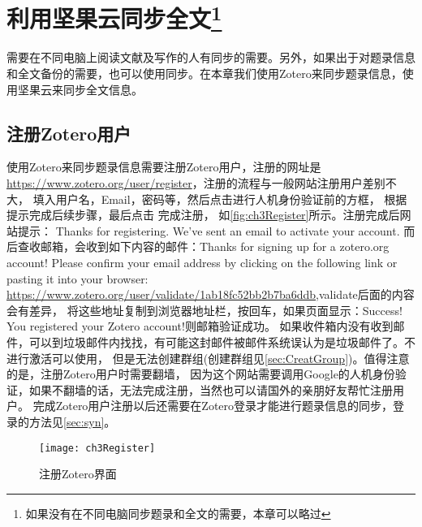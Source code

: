 \documentclass[cn,11pt,chinese]{elegantbook}
\begin{document}
	\chapter[利用坚果云同步全文]{利用坚果云同步全文\footnote{如果没有在不同电脑同步题录和全文的需要，本章可以略过}}\label{ch:syn}		
		需要在不同电脑上阅读文献及写作的人有同步的需要。另外，如果出于对题录信息和全文备份的需要，也可以使用同步。在本章我们使用Zotero来同步题录信息，使用坚果云来同步全文信息。
			\section{注册Zotero用户}\label{sec:zotReg}
		使用Zotero来同步题录信息需要注册Zotero用户，注册的网址是\url{https://www.zotero.org/user/register}，注册的流程与一般网站注册用户差别不大，
		填入用户名，Email，密码等，然后点击进行人机身份验证前的方框，
		根据提示完成后续步骤，最后点击 完成注册，
		如\autoref{fig:ch3Register}所示。注册完成后网站提示：
		Thanks for registering. We’ve sent an email to activate your account.
		而后查收邮箱，会收到如下内容的邮件：Thanks for signing up for a zotero.org account! Please confirm your email address 
		by clicking on the following link or pasting it into your browser: 
		\url{https://www.zotero.org/user/validate/1ab18fc52bb2b7ba6ddb},validate后面的内容会有差异，
		将这些地址复制到浏览器地址栏，按回车，如果页面显示：Success! You registered your Zotero account!则邮箱验证成功。
		如果收件箱内没有收到邮件，可以到垃圾邮件内找找，有可能这封邮件被邮件系统误认为是垃圾邮件了。不进行激活可以使用，
		但是无法创建群组(创建群组见\cref{sec:CreatGroup})。值得注意的是，注册Zotero用户时需要翻墙，
		因为这个网站需要调用Google的人机身份验证，如果不翻墙的话，无法完成注册，当然也可以请国外的亲朋好友帮忙注册用户。
		完成Zotero用户注册以后还需要在Zotero登录才能进行题录信息的同步，登录的方法见\cref{sec:syn}。
		\begin{figure}[htbp]
			\centering
			\texttt{[image: ch3Register]}
			\caption{注册Zotero界面}
			\label{fig:ch3Register}
		\end{figure}
		
\end{document}
